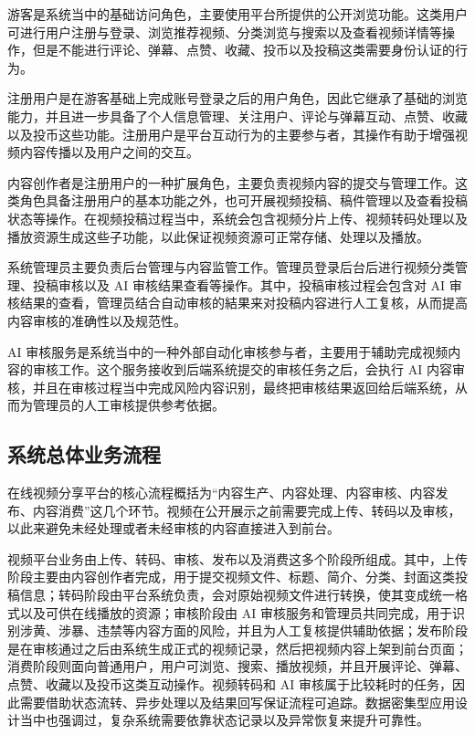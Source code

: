 游客是系统当中的基础访问角色，主要使用平台所提供的公开浏览功能。这类用户可进行用户注册与登录、浏览推荐视频、分类浏览与搜索以及查看视频详情等操作，但是不能进行评论、弹幕、点赞、收藏、投币以及投稿这类需要身份认证的行为。

注册用户是在游客基础上完成账号登录之后的用户角色，因此它继承了基础的浏览能力，并且进一步具备了个人信息管理、关注用户、评论与弹幕互动、点赞、收藏以及投币这些功能。注册用户是平台互动行为的主要参与者，其操作有助于增强视频内容传播以及用户之间的交互。

内容创作者是注册用户的一种扩展角色，主要负责视频内容的提交与管理工作。这类角色具备注册用户的基本功能之外，也可开展视频投稿、稿件管理以及查看投稿状态等操作。在视频投稿过程当中，系统会包含视频分片上传、视频转码处理以及播放资源生成这些子功能，以此保证视频资源可正常存储、处理以及播放。

系统管理员主要负责后台管理与内容监管工作。管理员登录后台后进行视频分类管理、投稿审核以及 AI 审核结果查看等操作。其中，投稿审核过程会包含对 AI 审核结果的查看，管理员结合自动审核的結果来对投稿内容进行人工复核，从而提高内容审核的准确性以及规范性。

AI 审核服务是系统当中的一种外部自动化审核参与者，主要用于辅助完成视频内容的审核工作。这个服务接收到后端系统提交的审核任务之后，会执行 AI 内容审核，并且在审核过程当中完成风险内容识别，最终把审核结果返回给后端系统，从而为管理员的人工审核提供参考依据。

\subsection{系统总体业务流程}

在线视频分享平台的核心流程概括为“内容生产、内容处理、内容审核、内容发布、内容消费”这几个环节。视频在公开展示之前需要完成上传、转码以及审核，以此来避免未经处理或者未经审核的内容直接进入到前台。

视频平台业务由上传、转码、审核、发布以及消费这多个阶段所组成。其中，上传阶段主要由内容创作者完成，用于提交视频文件、标题、简介、分类、封面这类投稿信息；转码阶段由平台系统负责，会对原始视频文件进行转换，使其变成统一格式以及可供在线播放的资源；审核阶段由 AI 审核服务和管理员共同完成，用于识别涉黄、涉暴、违禁等内容方面的风险，并且为人工复核提供辅助依据；发布阶段是在审核通过之后由系统生成正式的视频记录，然后把视频内容上架到前台页面；消费阶段则面向普通用户，用户可浏览、搜索、播放视频，并且开展评论、弹幕、点赞、收藏以及投币这类互动操作。视频转码和 AI 审核属于比较耗时的任务，因此需要借助状态流转、异步处理以及结果回写保证流程可追踪。数据密集型应用设计当中也强调过，复杂系统需要依靠状态记录以及异常恢复来提升可靠性\cite{kleppmann2017ddia}。

